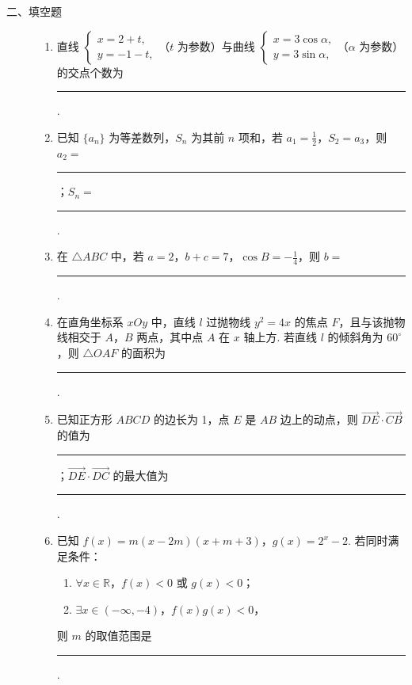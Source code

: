 \begin{description}

    \item[二、填空题]

    \begin{enumerate}[leftmargin=5pt]

      \addtocounter{enumi}{+8}

        \item 直线 \(\begin{cases}
x=2+t,\\
y=-1-t,
\end{cases}\)（\(t\) 为参数）与曲线 \(\begin{cases}
x=3\cos\alpha,\\
y=3\sin\alpha,
\end{cases}\)（\(\alpha\) 为参数）的交点个数为\rule[-0.3ex]{3em}{0.4pt}.

        \item 已知 \(\{a_n\}\) 为等差数列，\(S_n\) 为其前 \(n\) 项和，若 \(a_1=\frac{1}{2}\)，\(S_2=a_3\)，则 \(a_2=\)\rule[-0.3ex]{3em}{0.4pt}；\(S_n=\)\rule[-0.3ex]{3em}{0.4pt}.

        \item 在 \(\triangle ABC\) 中，若 \(a=2\)，\(b+c=7\)，\(\cos B=-\frac{1}{4}\)，则 \(b=\)\rule[-0.3ex]{3em}{0.4pt}.

        \item 在直角坐标系 \(xOy\) 中，直线 \(l\) 过抛物线 \(y^2 = 4x\) 的焦点 \(F\)，且与该抛物线相交于 \(A\)，\(B\) 两点，其中点 \(A\) 在 \(x\) 轴上方. 若直线 \(l\) 的倾斜角为 \(60^\circ\)，则 \(\triangle OAF\) 的面积为\rule[-0.3ex]{3em}{0.4pt}.

        \item 已知正方形 \(ABCD\) 的边长为 1，点 \(E\) 是 \(AB\) 边上的动点，则 \(\overrightarrow{DE} \cdot \overrightarrow{CB}\) 的值为\rule[-0.3ex]{3em}{0.4pt}；\(\overrightarrow{DE} \cdot \overrightarrow{DC}\) 的最大值为\rule[-0.3ex]{3em}{0.4pt}.

        \item 已知 \(f(x)=m(x-2m)(x+m+3)\)，\(g(x)=2^x-2\). 若同时满足条件：

\begin{enumerate}
\item \(\forall x\in\mathbb{R}\)，\(f(x)<0\) 或 \(g(x)<0\)；
\item \(\exists x\in(-\infty,-4)\)，\(f(x)g(x)<0\)，
\end{enumerate}

则 \(m\) 的取值范围是\rule[-0.3ex]{3em}{0.4pt}.

    \end{enumerate}

\end{description}

